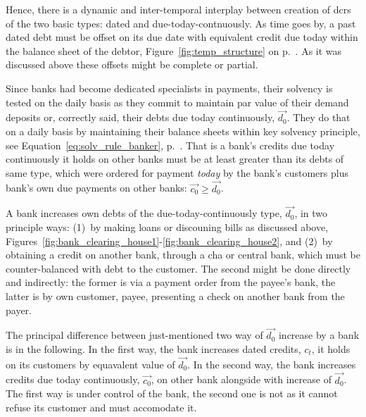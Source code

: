 Hence, there is a dynamic and inter-temporal interplay between creation of \acfp{dcr} of the two basic types: dated and due-today-contnuously. As time goes by, a past dated debt must be offset on its due date with equivalent credit due today within the balance sheet of the debtor, Figure~\ref{fig:temp_structure} on p.~\pageref{fig:temp_structure}. As it was discussed above these offsets might be complete or partial.

Since banks had become dedicated specialists in payments, their solvency is tested on the daily basis as they commit to maintain par value of their demand deposits or, correctly said, their debts due today continuously, $\overrightarrow{d_0}$. They do that on a daily basis by maintaining their balance sheets within key solvency principle, see Equation~\ref{eq:solv_rule_banker}, p.~\pageref{eq:solv_rule_banker}. That is a bank's credits due today continuously it holds on other banks must be at least greater than its debts of same type, which were ordered for payment \textit{today} by the bank's customers plus bank's own due payments on other banks: $\overrightarrow{c_0} \geq \overrightarrow{d_0}$.  

A bank increases own  debts of the due-today-continuously type, $\overrightarrow{d_0}$, in two principle ways: (1)~by making loans or discouning bills as discussed above, Figures~\ref{fig:bank_clearing_house1}-\ref{fig:bank_clearing_house2}, and (2)~by obtaining a credit on another bank, through a \acf{cha} or central bank, which must be counter-balanced with debt to the customer. The second might be done directly and indirectly: the former is via a payment order from the payee's bank, the latter is by own customer, payee, presenting a check on another bank from the payer. 

The principal difference between just-mentioned two way of $\overrightarrow{d_0}$ increase by a bank is in the following. In the first way, the bank increases dated credits, $c_t$, it holds on its customers by equavalent value of $\overrightarrow{d_0}$. In the second way, the bank increases credits due today continuously, $\overrightarrow{c_0}$, on other bank alongside with increase of $\overrightarrow{d_0}$. The first way is under control of the bank, the second one is not as it cannot refuse its customer and must accomodate it.

